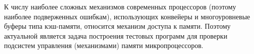 {К числу наиболее сложных механизмов современных процессоров (поэтому наиболее подверженных ошибкам), использующих конвейеры и многоуровневые буферы типа кэш-памяти, относится механизм доступа к памяти. Поэтому актуальной является задача построения тестовых программ для проверки подсистем управления (механизмами) памяти микропроцессоров.










}

